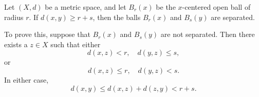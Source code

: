 \documentclass[12pt]{article}
\begin{document}
Let $(X,d)$ be a metric space, and let $B_r(x)$ be the $x$-centered
open ball of radius $r$. If 
$d(x,y)\ge r+s$, then the balls
$B_r(x)$ and $B_s(y)$ are separated.

To prove this, suppose  that $B_r(x)$ and $B_s(y)$ are not separated. 
Then there exists a $z\in X$ such that either
$$
    d(x,z)<r, \quad d(y,z)\le s,
$$
or
$$
    d(x,z)\le r, \quad d(y,z)< s.
$$
In either case, 
$$
   d(x,y)\le d(x,z)+d(z,y)<r+s.
$$
\end{document}
